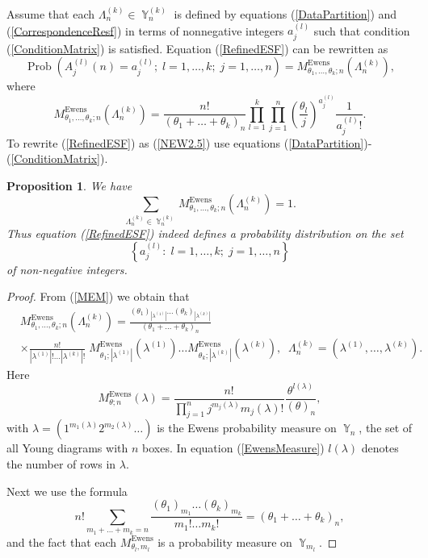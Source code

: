 \documentclass[12pt]{amsart}
\newtheorem{prop}[thm]{Proposition}
\theoremstyle{definition}
\numberwithin{equation}{section}
\DeclareMathOperator{\Prob}{Prob}
\DeclareMathOperator{\Y}{\mathbb{Y}}
\DeclareMathOperator{\Ewens}{Ewens}
\begin{document}
Assume that each $\Lambda_n^{(k)}\in\Y_n^{(k)}$ is defined by equations (\ref{DataPartition}) and (\ref{CorrespondenceResf}) in terms of nonnegative integers $a_j^{(l)}$ such that condition (\ref{ConditionMatrix}) is satisfied. Equation (\ref{RefinedESF}) can be rewritten as
\begin{equation}\label{NEW2.5}
\Prob\left(A_j^{(l)}(n)=a_j^{(l)};\; l=1,\ldots,k;\; j=1,\ldots,n\right)
=M_{\theta_1,\ldots,\theta_k;n}^{\Ewens}(\Lambda_n^{(k)}),
\end{equation}
where
\begin{equation}\label{MEM}
M_{\theta_1,\ldots,\theta_k;n}^{\Ewens}(\Lambda_n^{(k)})=
\frac{n!}{\left(\theta_1+\ldots+\theta_k\right)_n}\prod\limits_{l=1}^k\prod\limits_{j=1}^n
\left(\frac{\theta_l}{j}\right)^{a_j^{(l)}}\frac{1}{a_j^{(l)}!}.
\end{equation}
To rewrite (\ref{RefinedESF}) as (\ref{NEW2.5})  use equations (\ref{DataPartition})-(\ref{ConditionMatrix}).
\begin{prop}\label{PropositionIndeedDistribution}
We have
$$
\sum\limits_{\Lambda_n^{(k)}\in\Y_n^{(k)}}M_{\theta_1,\ldots,\theta_k;n}^{\Ewens}(\Lambda_n^{(k)})=1.
$$
Thus equation (\ref{RefinedESF}) indeed defines a probability distribution on the set
$$
\left\{a_j^{(l)}:\;l=1,\ldots,k;\; j=1,\ldots,n\right\}
$$
of non-negative integers.
\end{prop}
\begin{proof}
From (\ref{MEM}) we obtain that
\begin{equation}\label{MultipleEwensMeasure}
\begin{split}
&M_{\theta_1,\ldots,\theta_k;n}^{\Ewens}\left(\Lambda_n^{(k)}\right)
=\frac{\left(\theta_1\right)_{|\lambda^{(1)}|}\ldots \left(\theta_k\right)_{|\lambda^{(k)}|
}}{\left(\theta_1+\ldots+\theta_k\right)_n}\\
&\times\frac{n!}{|\lambda^{(1)}|!\ldots |\lambda^{(k)}|!}\;
M_{\theta_1;|\lambda^{(1)}|}^{\Ewens}\left(\lambda^{(1)}\right)
\ldots M_{\theta_k;|\lambda^{(k)}|}^{\Ewens}\left(\lambda^{(k)}\right),\;\;
\Lambda_n^{(k)}=\left(\lambda^{(1)},\ldots,\lambda^{(k)}\right).
\end{split}
\end{equation}
Here
\begin{equation}\label{EwensMeasure}
M_{\theta; n}^{\Ewens}\left(\lambda\right)=\frac{n!}{\prod_{j=1}^{n}j^{m_j(\lambda)}m_j(\lambda)!}\frac{\theta^{l(\lambda)}}{(\theta)_n},
\end{equation}
with $\lambda=\left(1^{m_1(\lambda)}2^{m_2(\lambda)}\ldots\right)$ is the Ewens probability measure on $\Y_n$, the set of all Young diagrams with $n$ boxes. In equation (\ref{EwensMeasure})
$l(\lambda)$ denotes the number of rows in $\lambda$.

Next we use the formula
\begin{equation}\label{SummationHyper}
n!\sum\limits_{m_1+\ldots+m_k=n}\frac{(\theta_1)_{m_1}\ldots(\theta_k)_{m_k}}{m_1!\ldots m_k!}=\left(\theta_1+\ldots+\theta_k\right)_n,
\end{equation}
and the fact that each $M_{\theta_l,m_l}^{\Ewens}$ is a probability measure on $\Y_{m_l}$.
\end{proof}
\end{document}
